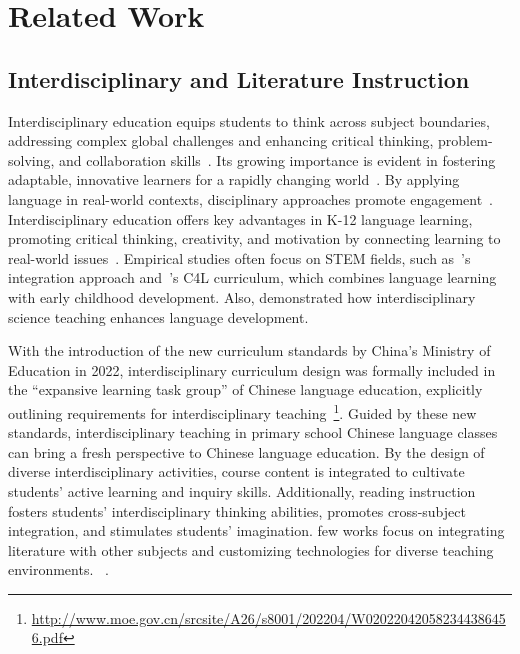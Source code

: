 \section{Related Work}
\label{sec:related_work}
\subsection{Interdisciplinary and Literature Instruction}
Interdisciplinary education equips students to think across subject boundaries, addressing complex global challenges and enhancing critical thinking, problem-solving, and collaboration skills~\cite{rhoten2006interdisciplinary}.
Its growing importance is evident in fostering adaptable, innovative learners for a rapidly changing world~\cite{you2017teach}. 
By applying language in real-world contexts, disciplinary approaches promote engagement~\cite{towhidnejad2011introducing}. Interdisciplinary education offers key advantages in K-12 language learning, promoting critical thinking, creativity, and motivation by connecting learning to real-world issues~\cite{bestelmeyer2015collaboration, hardre2013teachers}. 
Empirical studies often focus on STEM fields, such as~\citet{english2016stem}’s integration approach and~\citet{sarama2017interdisciplinary}'s C4L curriculum, which combines language learning with early childhood development. Also, \citet{czerniak2014interdisciplinary} demonstrated how interdisciplinary science teaching enhances language development.

With the introduction of the new curriculum standards by China's Ministry of Education in 2022, interdisciplinary curriculum design was formally included in the ``expansive learning task group'' of Chinese language education, explicitly outlining requirements for interdisciplinary teaching~\footnote{\url{http://www.moe.gov.cn/srcsite/A26/s8001/202204/W020220420582344386456.pdf}}. 
Guided by these new standards, interdisciplinary teaching in primary school Chinese language classes can bring a fresh perspective to Chinese language education. By the design of diverse interdisciplinary activities, course content is integrated to cultivate students' active learning and inquiry skills. 
Additionally, reading instruction fosters students' interdisciplinary thinking abilities, promotes cross-subject integration, and stimulates students' imagination. 
few works focus on integrating literature with other subjects and customizing technologies for diverse teaching environments. 
~\cite{boix2010interdisciplinarity, yarker2012analysis}. 

